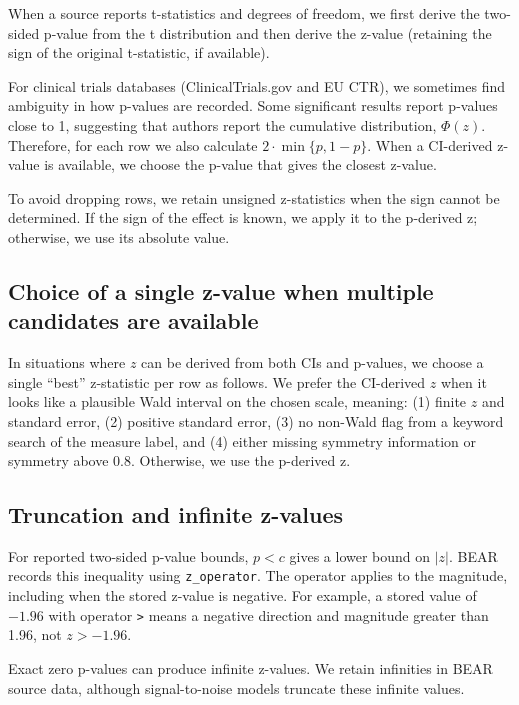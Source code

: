 \documentclass[
  11pt,
]{article}
\begin{document}
When a source reports t-statistics and degrees of freedom, we first
derive the two-sided p-value from the t distribution and then derive the
z-value (retaining the sign of the original t-statistic, if available).

For clinical trials databases (ClinicalTrials.gov and EU CTR), we
sometimes find ambiguity in how p-values are recorded. Some significant
results report p-values close to 1, suggesting that authors report the
cumulative distribution, \(\Phi(z)\). Therefore, for each row we also
calculate \(2\cdot\min\{p,1-p\}\). When a CI-derived z-value is
available, we choose the p-value that gives the closest z-value.

To avoid dropping rows, we retain unsigned z-statistics when the sign
cannot be determined. If the sign of the effect is known, we apply it to
the p-derived z; otherwise, we use its absolute value.

\subsection{Choice of a single z-value when multiple candidates are
available}\label{choice-of-a-single-z-value-when-multiple-candidates-are-available}

In situations where \(z\) can be derived from both CIs and p-values, we
choose a single ``best'' z-statistic per row as follows. We prefer the
CI-derived \(z\) when it looks like a plausible Wald interval on the
chosen scale, meaning: (1) finite \(z\) and standard error, (2) positive
standard error, (3) no non-Wald flag from a keyword search of the
measure label, and (4) either missing symmetry information or symmetry
above 0.8. Otherwise, we use the p-derived z.

\subsection{Truncation and infinite
z-values}\label{truncation-and-infinite-z-values}

For reported two-sided p-value bounds, \(p<c\) gives a lower bound on
\(|z|\). BEAR records this inequality using \texttt{z\_operator}. The
operator applies to the magnitude, including when the stored z-value is
negative. For example, a stored value of \(-1.96\) with operator
\texttt{\textgreater{}} means a negative direction and magnitude greater
than 1.96, not \(z>-1.96\).

Exact zero p-values can produce infinite z-values. We retain infinities
in BEAR source data, although signal-to-noise models truncate these
infinite values.
\end{document}
